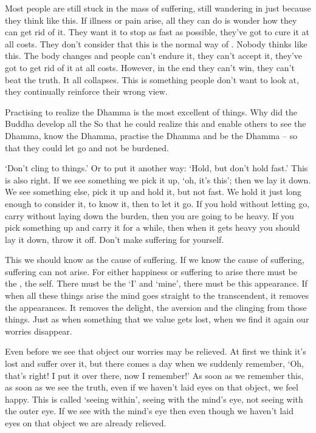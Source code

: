 Most people are still stuck in the mass of suffering, still wandering in  just because they think like this. If illness or pain arise, all they can do is wonder how they can get rid of it. They want it to stop as fast as possible, they've got to cure it at all costs. They don't consider that this is the normal way of . Nobody thinks like this. The body changes and people can't endure it, they can't accept it, they've got to get rid of it at all costs. However, in the end they can't win, they can't beat the truth. It all collapses. This is something people don't want to look at, they continually reinforce their wrong view.

Practising to realize the Dhamma is the most excellent of things. Why did the Buddha develop all the  So that he could realize this and enable others to see the Dhamma, know the Dhamma, practise the Dhamma and be the Dhamma -- so that they could let go and not be burdened.

`Don't cling to things.' Or to put it another way: `Hold, but don't hold fast.' This is also right. If we see something we pick it up, `oh, it's this'; then we lay it down. We see something else, pick it up and hold it, but not fast. We hold it just long enough to consider it, to know it, then to let it go. If you hold without letting go, carry without laying down the burden, then you are going to be heavy. If you pick something up and carry it for a while, then when it gets heavy you should lay it down, throw it off. Don't make suffering for yourself.

This we should know as the cause of suffering. If we know the cause of suffering, suffering can not arise. For either happiness or suffering to arise there must be the , the self. There must be the `I' and `mine', there must be this appearance. If when all these things arise the mind goes straight to the transcendent, it removes the appearances. It removes the delight, the aversion and the clinging from those things. Just as when something that we value gets lost, when we find it again our worries disappear.

Even before we see that object our worries may be relieved. At first we think it's lost and suffer over it, but there comes a day when we suddenly remember, `Oh, that's right! I put it over there, now I remember!' As soon as we remember this, as soon as we see the truth, even if we haven't laid eyes on that object, we feel happy. This is called `seeing within', seeing with the mind's eye, not seeing with the outer eye. If we see with the mind's eye then even though we haven't laid eyes on that object we are already relieved.

